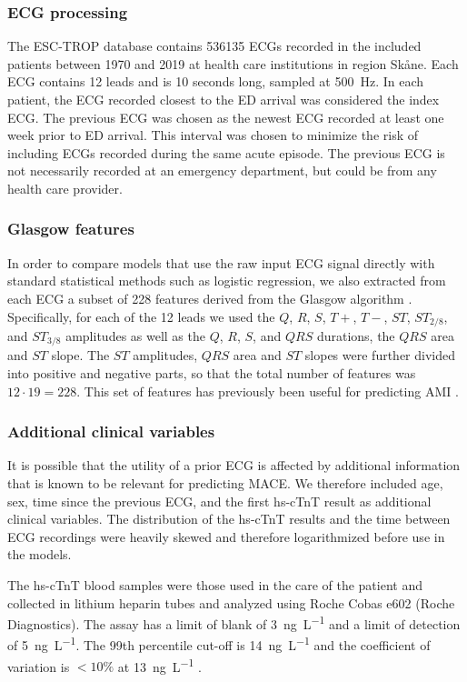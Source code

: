 \documentclass[preprint]{elsarticle}
\begin{document}
\subsubsection{ECG processing}
The ESC-TROP database contains 536135 ECGs recorded in the included patients between 1970 and 2019 at health care institutions in region Sk\aa{}ne. Each ECG contains 12 leads and is 10 seconds long, sampled at \SI{500}{\hertz}. In each patient, the ECG recorded closest to the ED arrival was considered the index ECG. The previous ECG was chosen as the newest ECG recorded at least one week prior to ED arrival. This interval was chosen to minimize the risk of including ECGs recorded during the same acute episode. The previous ECG is not necessarily recorded at an emergency department, but could be from any health care provider.

\subsubsection{Glasgow features}
\label{sec:glasgow}
In order to compare models that use the raw input ECG signal directly with standard statistical methods such as logistic regression, we also extracted from each ECG a subset of 228 features derived from the Glasgow algorithm \citep{macfarlane2005}. Specifically, for each of the 12 leads we used the $Q$, $R$, $S$, $T+$, $T-$, $ST$, $ST_{2/8}$, and $ST_{3/8}$ amplitudes as well as the $Q$, $R$, $S$, and $QRS$ durations, the $QRS$ area and $ST$ slope. The $ST$ amplitudes, $QRS$ area and $ST$ slopes were further divided into positive and negative parts, so that the total number of features was $12 \cdot 19=228$. This set of features has previously been useful for predicting AMI \citep{forberg2009}.

\subsubsection{Additional clinical variables}
It is possible that the utility of a prior ECG is affected by additional information that is known to be relevant for predicting MACE. We therefore included age, sex, time since the previous ECG, and the first hs-cTnT result as additional clinical variables. The distribution of the hs-cTnT results and the time between ECG recordings were heavily skewed and therefore logarithmized before use in the models. 

The hs-cTnT blood samples were those used in the care of the patient and collected in lithium heparin tubes and analyzed using Roche Cobas e602 (Roche Diagnostics). The assay has a limit of blank of \SI{3}{\nano\gram\per\liter} and a limit of detection of \SI{5}{\nano\gram\per\liter}. The 99th percentile cut-off is \SI{14}{\nano\gram\per\liter} and the coefficient of variation is $<10\%$ at \SI{13}{\nano\gram\per\liter} \citep{giannitsis2010}.
\end{document}
